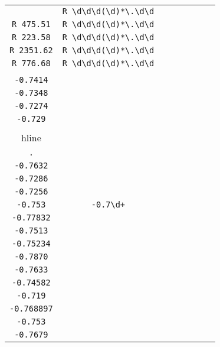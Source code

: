 \begin{longtable}{cccccccc}
\begin{tabular}{ll}
    \verb|R 511.65| & \verb|R \d\d\d(\d)*\.\d\d|\\
\verb|R 475.51| & \verb|R \d\d\d(\d)*\.\d\d|\\
\verb|R 223.58| & \verb|R \d\d\d(\d)*\.\d\d|\\
\verb|R 2351.62| & \verb|R \d\d\d(\d)*\.\d\d|\\
\verb|R 776.68| & \verb|R \d\d\d(\d)*\.\d\d|
\end{tabular}
\\\midrule 
\begin{tabular}{l}
    \verb|-0.7302|\\
\verb|-0.7414|\\
\verb|-0.7348|\\
\verb|-0.7274|\\
\verb|-0.729|\\
\\hline\\
\verb|.|\\
\verb|-0.7632|\\
\verb|-0.7286|\\
\verb|-0.7256|\\
\verb|-0.753|
\end{tabular}

&
\verb|-0.7\d+|
&

\begin{tabular}{l}
    \verb|-0\.7\d\d(\d)*|\\
\verb|-0.77832|\\
\verb|-0.7513|\\
\verb|-0.75234|\\
\verb|-0.7870|\\
\verb|-0.7633|
\end{tabular}

&

\begin{tabular}{l}
    \verb|-0\.7(\d)*\d\d|\\
\verb|-0.74582|\\
\verb|-0.719|\\
\verb|-0.768897|\\
\verb|-0.753|\\
\verb|-0.7679|
\end{tabular}

&


\end{longtable}
